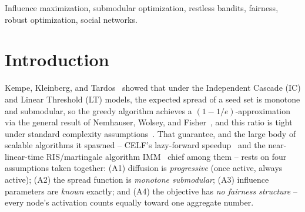 \documentclass[journal]{IEEEtran}
\begin{document}
\begin{abstract}
$6\times$ the best one-shot baseline's spread at the most severe recovery
rate tested, and show the egalitarian fix raising worst-off-group reach at
negligible spread cost. We validate generalization on three further
synthetic graphs (two scales, a structurally different scale-free
topology) and three real social networks at increasing scale (224,
168, and 532-node Facebook ego-networks): the synthetic-graph finding
reproduces cleanly, and an initial real-network divergence traced to two
causes -- an insufficient compute budget and a harness bug that gave
one-shot baselines an unearned one-round propagation head start over
MF-BWI-Fair and a repeated-greedy baseline -- is resolved once both are
fixed, restoring MF-BWI-Fair's lead over every one-shot classical
baseline at all three real-graph scales; the sole disclosed exception is
a small, stable margin behind the more expensive repeated-greedy rollout
baseline on the largest real graph, attributed to a genuine ramp-up-speed
cost of the mean-field relaxation on richer community structure rather
than the harness artifact. We additionally benchmark our IMM
reimplementation against the original authors' own C++ code and find it
trustworthy (within 0.6\% expected spread).
\end{abstract}

\begin{IEEEkeywords}
Influence maximization, submodular optimization, restless bandits, fairness,
robust optimization, social networks.
\end{IEEEkeywords}

\section{Introduction}

Kempe, Kleinberg, and Tardos~\cite{kempe2003maximizing} showed that under the
Independent Cascade (IC) and Linear Threshold (LT) models, the expected spread
of a seed set is monotone and submodular, so the greedy algorithm achieves a
$(1-1/e)$-approximation via the general result of Nemhauser, Wolsey, and
Fisher~\cite{nemhauser1978analysis}, and this ratio is tight under standard
complexity assumptions~\cite{feige1998threshold}. That guarantee, and the
large body of scalable algorithms it spawned -- CELF's lazy-forward
speedup~\cite{leskovec2007cost} and the near-linear-time RIS/martingale
algorithm IMM~\cite{tang2015influence,borgs2014maximizing} chief among them --
rests on four assumptions taken together: (A1) diffusion is
\emph{progressive} (once active, always active); (A2) the spread function is
\emph{monotone submodular}; (A3) influence parameters are \emph{known}
exactly; and (A4) the objective has \emph{no fairness structure} -- every
node's activation counts equally toward one aggregate number.
\end{document}

